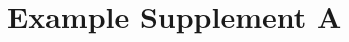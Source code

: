 \documentclass[hidelinks,a4paper,11pt,openany]{article}
\newcommand{\supplementName}{Example Supplement A}
\begin{document}
\section*{\supplementName}




\end{document}
